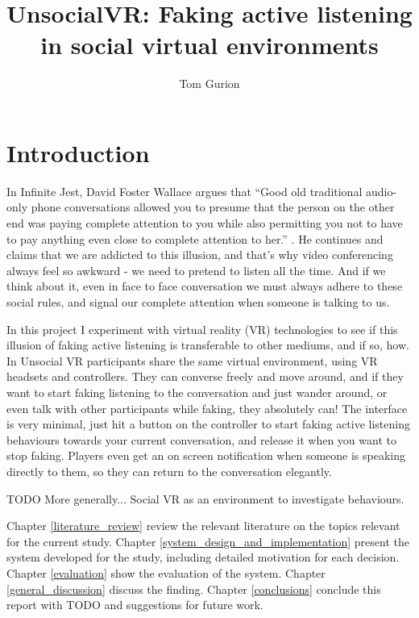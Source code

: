 \documentclass[]{simple-thesis}
\title{UnsocialVR: Faking active listening in social virtual environments}
\author{Tom Gurion}
\affiliation{Media and Arts Technology\\Queen Mary University of London}
\begin{document}
\frontmatter{}  %


\setcounter{page}{1}  %
\chapter{Introduction}

In Infinite Jest, David Foster Wallace argues that ``Good old traditional audio-only phone conversations allowed you to presume that the person on the other end was paying complete attention to you while also permitting you not to have to pay anything even close to complete attention to her.'' \citep{Wallace1996}.
He continues and claims that we are addicted to this illusion, and that's why video conferencing always feel so awkward - we need to pretend to listen all the time.
And if we think about it, even in face to face conversation we must always adhere to these social rules, and signal our complete attention when someone is talking to us.

In this project I experiment with virtual reality (VR) technologies to see if this illusion of faking active listening is transferable to other mediums, and if so, how.
In Unsocial VR participants share the same virtual environment, using VR headsets and controllers.
They can converse freely and move around, and if they want to start faking listening to the conversation and just wander around, or even talk with other participants while faking, they absolutely can!
The interface is very minimal, just hit a button on the controller to start faking active listening behaviours towards your current conversation, and release it when you want to stop faking.
Players even get an on screen notification when someone is speaking directly to them, so they can return to the conversation elegantly.

TODO More generally...
Social VR as an environment to investigate behaviours.

Chapter \ref{literature_review} review the relevant literature on the topics relevant for the current study.
Chapter \ref{system_design_and_implementation} present the system developed for the study, including detailed motivation for each decision.
Chapter \ref{evaluation} show the evaluation of the system.
Chapter \ref{general_discussion} discuss the finding.
Chapter \ref{conclusions} conclude this report with TODO and suggestions for future work.
\end{document}
